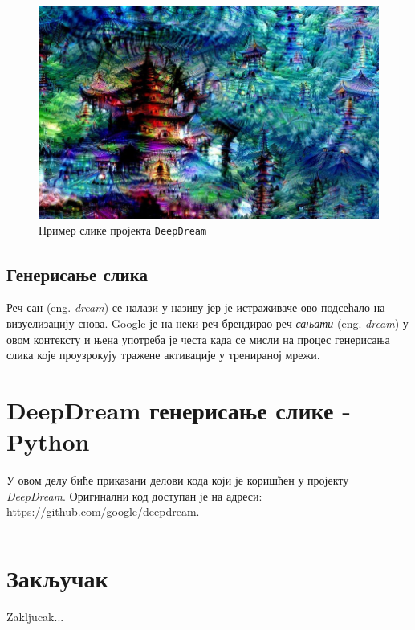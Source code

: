 \documentclass[a4paper]{article}
\begin{document}
\begin{figure}[h!]
\begin{center}
    \includegraphics[width=\textwidth]{./resources/deepdream2.jpg}
\end{center}
\caption{Пример слике пројекта \texttt{DeepDream}}
\label{fig:deepdream2}
\end{figure}

\subsection{Генерисање слика}
\label{subsec:deepdreamGenerate}
Реч сан (eng. \textit{dream})
се налази у називу јер је истраживаче ово подсећало на визуелизацију снова. Google је на неки реч
брендирао реч \textit{сањати} (eng. \textit{dream}) у овом контексту и њена употреба је честа када
се мисли на процес генерисања слика које проузрокују тражене активације у тренираној мрежи.

\section{DeepDream генерисање слике - Python}
У овом делу биће приказани делови кода који је коришћен у пројекту \textit{DeepDream}.
Оригинални код доступан је на адреси: \\
\url{https://github.com/google/deepdream}.

\begin{verbatim}
\end{verbatim}

\section{Закључак}
Zakljucak...

\appendix


\end{document}
